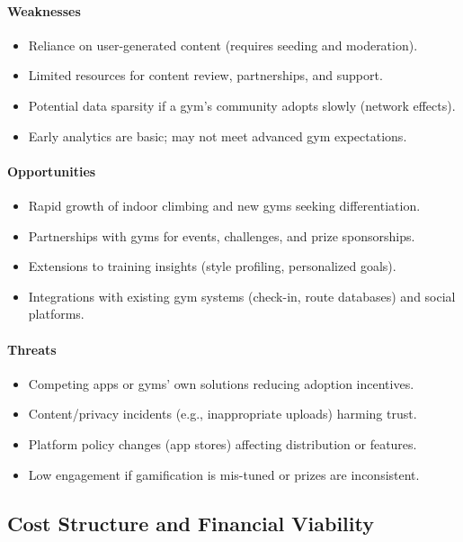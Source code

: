 \documentclass[12pt,a4paper]{report}
\renewcommand\_{\textunderscore\hspace{0pt}}
\begin{document}
\paragraph{Weaknesses}
\begin{itemize}[noitemsep]
    \item Reliance on user-generated content (requires seeding and moderation).
    \item Limited resources for content review, partnerships, and support.
    \item Potential data sparsity if a gym's community adopts slowly (network effects).
    \item Early analytics are basic; may not meet advanced gym expectations.
\end{itemize}

\paragraph{Opportunities}
\begin{itemize}[noitemsep]
    \item Rapid growth of indoor climbing and new gyms seeking differentiation.
    \item Partnerships with gyms for events, challenges, and prize sponsorships.
    \item Extensions to training insights (style profiling, personalized goals).
    \item Integrations with existing gym systems (check-in, route databases) and social platforms.
\end{itemize}

\paragraph{Threats}
\begin{itemize}[noitemsep]
    \item Competing apps or gyms' own solutions reducing adoption incentives.
    \item Content/privacy incidents (e.g., inappropriate uploads) harming trust.
    \item Platform policy changes (app stores) affecting distribution or features.
    \item Low engagement if gamification is mis-tuned or prizes are inconsistent.
\end{itemize}

\subsection{Cost Structure and Financial Viability}
\end{document}
